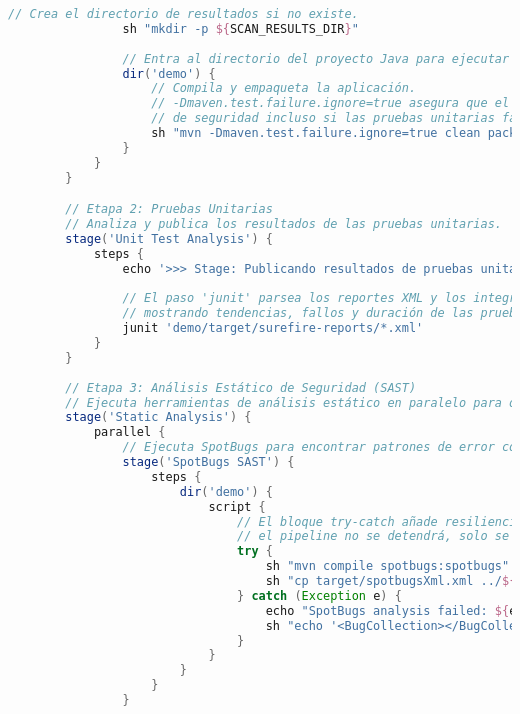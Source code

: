 \begin{lstlisting}[language=groovy, caption={Estructura completa del Jenkinsfile.}, label={lst:jenkinsfile}]
                // Crea el directorio de resultados si no existe.
                sh "mkdir -p ${SCAN_RESULTS_DIR}"
                
                // Entra al directorio del proyecto Java para ejecutar Maven.
                dir('demo') {
                    // Compila y empaqueta la aplicación. 
                    // -Dmaven.test.failure.ignore=true asegura que el pipeline continúe al análisis
                    // de seguridad incluso si las pruebas unitarias fallan, priorizando la seguridad.
                    sh "mvn -Dmaven.test.failure.ignore=true clean package"
                }
            }
        }

        // Etapa 2: Pruebas Unitarias
        // Analiza y publica los resultados de las pruebas unitarias.
        stage('Unit Test Analysis') {
            steps {
                echo '>>> Stage: Publicando resultados de pruebas unitarias...'
                
                // El paso 'junit' parsea los reportes XML y los integra en la UI de Jenkins,
                // mostrando tendencias, fallos y duración de las pruebas.
                junit 'demo/target/surefire-reports/*.xml'
            }
        }
        
        // Etapa 3: Análisis Estático de Seguridad (SAST)
        // Ejecuta herramientas de análisis estático en paralelo para optimizar el tiempo.
        stage('Static Analysis') {
            parallel {
                // Ejecuta SpotBugs para encontrar patrones de error comunes en el código Java.
                stage('SpotBugs SAST') {
                    steps {
                        dir('demo') {
                            script {
                                // El bloque try-catch añade resiliencia. Si SpotBugs falla,
                                // el pipeline no se detendrá, solo se registrará el error.
                                try {
                                    sh "mvn compile spotbugs:spotbugs"
                                    sh "cp target/spotbugsXml.xml ../${SCAN_RESULTS_DIR}/ || echo 'No SpotBugs report found'"
                                } catch (Exception e) {
                                    echo "SpotBugs analysis failed: ${e.getMessage()}"
                                    sh "echo '<BugCollection></BugCollection>' > ../${SCAN_RESULTS_DIR}/spotbugsXml.xml"
                                }
                            }
                        }
                    }
                }
                

\end{lstlisting}

